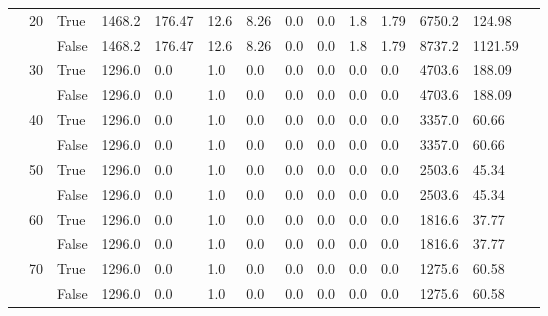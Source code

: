 \begin{appendices}
\begin{landscape}
\begin{small}
\begin{longtable}[c]{@{}lll|ll|ll|ll|ll|lll@{}}
   & 20 & True  & 1468.2          & 176.47         & 12.6          & 8.26          & 0.0           & 0.0           & 1.8           & 1.79          & 6750.2        & 124.98      &  \\
   &    & False & 1468.2          & 176.47         & 12.6          & 8.26          & 0.0           & 0.0           & 1.8           & 1.79          & 8737.2        & 1121.59     &  \\
   & 30 & True  & 1296.0          & 0.0            & 1.0           & 0.0           & 0.0           & 0.0           & 0.0           & 0.0           & 4703.6        & 188.09      &  \\
   &    & False & 1296.0          & 0.0            & 1.0           & 0.0           & 0.0           & 0.0           & 0.0           & 0.0           & 4703.6        & 188.09      &  \\
   & 40 & True  & 1296.0          & 0.0            & 1.0           & 0.0           & 0.0           & 0.0           & 0.0           & 0.0           & 3357.0        & 60.66       &  \\
   &    & False & 1296.0          & 0.0            & 1.0           & 0.0           & 0.0           & 0.0           & 0.0           & 0.0           & 3357.0        & 60.66       &  \\
   & 50 & True  & 1296.0          & 0.0            & 1.0           & 0.0           & 0.0           & 0.0           & 0.0           & 0.0           & 2503.6        & 45.34       &  \\
   &    & False & 1296.0          & 0.0            & 1.0           & 0.0           & 0.0           & 0.0           & 0.0           & 0.0           & 2503.6        & 45.34       &  \\
   & 60 & True  & 1296.0          & 0.0            & 1.0           & 0.0           & 0.0           & 0.0           & 0.0           & 0.0           & 1816.6        & 37.77       &  \\
   &    & False & 1296.0          & 0.0            & 1.0           & 0.0           & 0.0           & 0.0           & 0.0           & 0.0           & 1816.6        & 37.77       &  \\
   & 70 & True  & 1296.0          & 0.0            & 1.0           & 0.0           & 0.0           & 0.0           & 0.0           & 0.0           & 1275.6        & 60.58       &  \\
   &    & False & 1296.0          & 0.0            & 1.0           & 0.0           & 0.0           & 0.0           & 0.0           & 0.0           & 1275.6        & 60.58       &  \\

\end{longtable}
\end{small}
\end{landscape}
\end{appendices}
